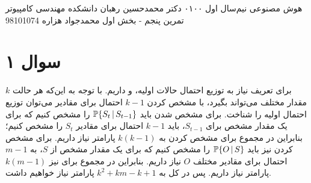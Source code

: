\documentclass[a4paper, 12pt]{article}
\begin{document}
\handout
{هوش مصنوعی}
{نیم‌سال اول ۰۱\lr{-}۰۰}
{دکتر محمدحسین رهبان}
{دانشکده مهندسی کامپیوتر}
{تمرین پنجم - بخش اول}
{محمدجواد هزاره}
{98101074}
\noindent
\\[-6em]
\section*{سوال ۱}
برای تعریف  نیاز به توزیع احتمال حالات اولیه،
و
داریم. با توجه به این‌که هر حالت $k$ مقدار مختلف می‌تواند بگیرد، با مشخص کردن $k-1$ احتمال برای مقادیر می‌توان توزیع احتمال اولیه را شناخت. برای مشخص شدن  باید 
${\mathbb P}\{S_t\,|\,S_{t-1}\}$
را مشخص کنیم که برای یک مقدار مشخص برای $S_{t-1}$، باید $k-1$ احتمال برای مقادیر $S_t$ را مشخص کنیم؛ بنابراین در مجموع برای مشخص کردن  به
$k(k-1)$
پارامتر نیاز داریم. برای مشخص کردن  نیز باید 
${\mathbb P}\{O\,|\,S\}$
را مشخص کنیم که برای یک مقدار مشخص از $S$، به $m-1$ احتمال برای مقادیر مختلف $O$ نیاز داریم. بنابراین در مجموع برای  نیز 
$k(m-1)$
پارامتر نیاز داریم. پس در کل به
$\boxed{k^2 + km - k + 1}$
پارامتر نیاز خواهیم داشت.
\end{document}
